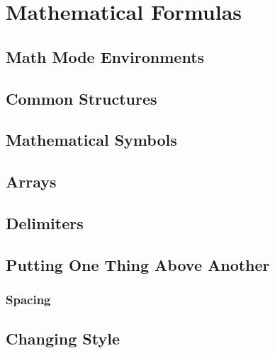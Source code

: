 \section{Mathematical Formulas}
\subsection{Math Mode Environments}


\subsection{Common Structures}


\subsection{Mathematical Symbols}


\subsection{Arrays}


\subsection{Delimiters}


\subsection{Putting One Thing Above Another}


\subsubsection{Spacing}


\subsection{Changing Style}
\newpage